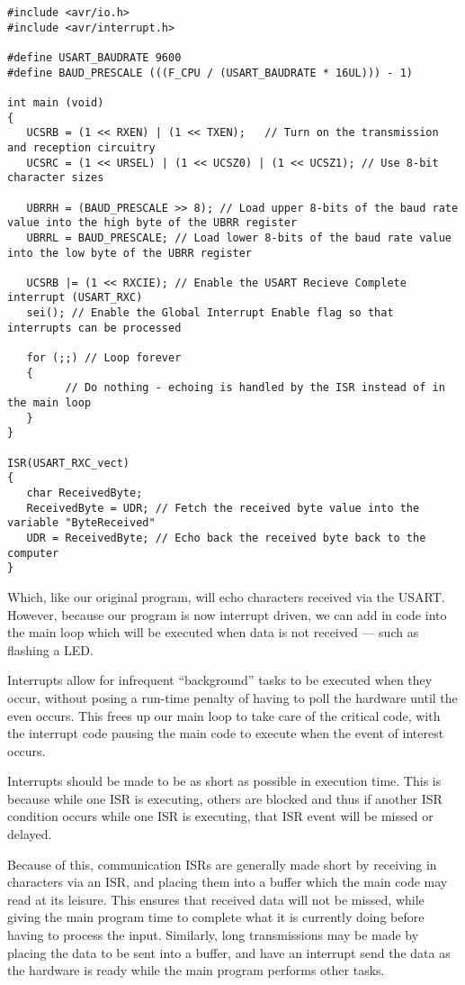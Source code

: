 \documentclass[a4paper,oneside,notitlepage]{book}
\begin{document}
\begin{center}
\begin{lstlisting}
#include <avr/io.h>
#include <avr/interrupt.h>

#define USART_BAUDRATE 9600
#define BAUD_PRESCALE (((F_CPU / (USART_BAUDRATE * 16UL))) - 1)

int main (void)
{
   UCSRB = (1 << RXEN) | (1 << TXEN);   // Turn on the transmission and reception circuitry
   UCSRC = (1 << URSEL) | (1 << UCSZ0) | (1 << UCSZ1); // Use 8-bit character sizes

   UBRRH = (BAUD_PRESCALE >> 8); // Load upper 8-bits of the baud rate value into the high byte of the UBRR register
   UBRRL = BAUD_PRESCALE; // Load lower 8-bits of the baud rate value into the low byte of the UBRR register

   UCSRB |= (1 << RXCIE); // Enable the USART Recieve Complete interrupt (USART_RXC)
   sei(); // Enable the Global Interrupt Enable flag so that interrupts can be processed

   for (;;) // Loop forever
   {
         // Do nothing - echoing is handled by the ISR instead of in the main loop
   }
}

ISR(USART_RXC_vect)
{
   char ReceivedByte;
   ReceivedByte = UDR; // Fetch the received byte value into the variable "ByteReceived"
   UDR = ReceivedByte; // Echo back the received byte back to the computer
}
\end{lstlisting}
\end{center}

Which, like our original program, will echo characters received via the USART. However, because our program is now interrupt driven, we can add in code into the main loop which will be executed when data is not received --- such as flashing a LED.

Interrupts allow for infrequent ``background'' tasks to be executed when they occur, without posing a run-time penalty of having to poll the hardware until the even occurs. This frees up our main loop to take care of the critical code, with the interrupt code pausing the main code to execute when the event of interest occurs.

Interrupts should be made to be as short as possible in execution time. This is because while one ISR is executing, others are blocked and thus if another ISR condition occurs while one ISR is executing, that ISR event will be missed or delayed.

Because of this, communication ISRs are generally made short by receiving in characters via an ISR, and placing them into a buffer which the main code may read at its leisure. This ensures that received data will not be missed, while giving the main program time to complete what it is currently doing before having to process the input. Similarly, long transmissions may be made by placing the data to be sent into a buffer, and have an interrupt send the data as the hardware is ready while the main program performs other tasks.
\end{document}
